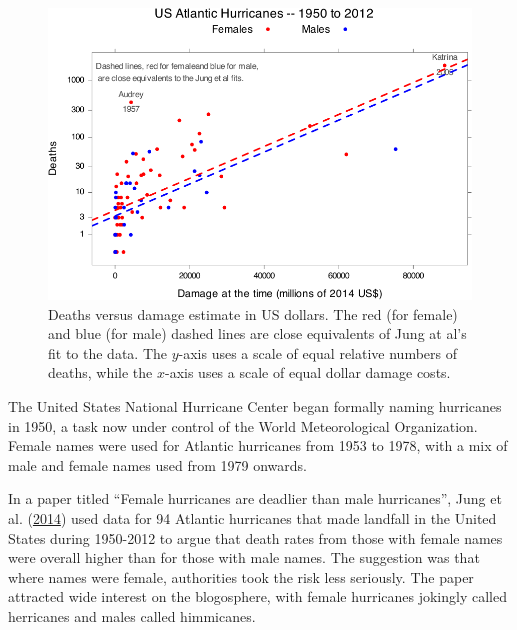 \documentclass[
  10pt,
  b5paper]{book}
\begin{document}
\begin{figure}[H]

{\centering \includegraphics[width=0.8\linewidth]{07-regress_files/figure-latex/hurricanes1-1} 

}

\caption{Deaths versus damage estimate in US dollars. The red (for female) 
and blue (for male) dashed lines are close equivalents of Jung at al's fit
to the data. The $y$-axis uses a scale of equal relative numbers of deaths, 
while the $x$-axis uses a scale of equal dollar damage costs.}\label{fig:hurricanes1}
\end{figure}

The United States National Hurricane Center began formally naming
hurricanes in 1950, a task now under control of the
World Meteorological Organization. Female names were used for
Atlantic hurricanes from 1953 to 1978, with a mix of male and
female names used from 1979 onwards.

In a paper titled ``Female hurricanes are deadlier than male
hurricanes'', Jung et al. (\protect\hyperlink{ref-jung2014female}{2014}) used data for 94 Atlantic hurricanes
that made landfall in the United States during 1950-2012 to argue
that death rates from those with female names were overall higher
than for those with male names. The suggestion was that where names
were female, authorities took the risk less seriously. The paper
attracted wide interest on the blogosphere, with female hurricanes
jokingly called herricanes and males called himmicanes.
\end{document}
